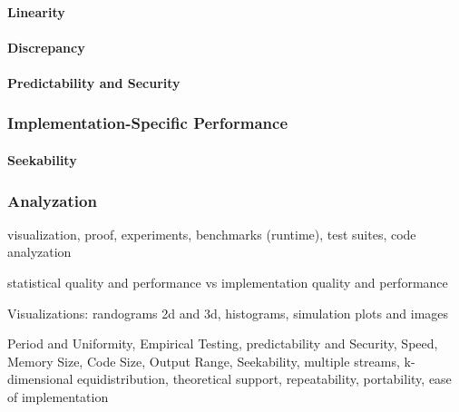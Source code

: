 \documentclass{stdlocal}
\begin{document}
    \paragraph{Linearity}
    \begin{definition}[Linearity]

    \end{definition}

    \paragraph{Discrepancy}

    \paragraph{Predictability and Security}


    \subsubsection{Implementation-Specific Performance}
    \paragraph{Seekability}


    \subsubsection{Analyzation}
    visualization, proof, experiments, benchmarks (runtime), test suites, code analyzation

    statistical quality and performance vs implementation quality and performance

    Visualizations: randograms 2d and 3d, histograms, simulation plots and images

    Period and Uniformity, Empirical Testing, predictability and Security, Speed, Memory Size, Code Size, Output Range, Seekability, multiple streams, k-dimensional equidistribution, theoretical support, repeatability, portability, ease of implementation
\end{document}
